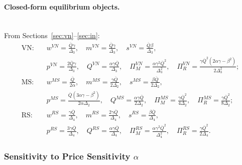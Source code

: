 \paragraph{Closed-form equilibrium objects.}\mbox{}\\
From Sections~\ref{sec:vn}--\ref{sec:in}:
\[
\begin{aligned}
\text{VN:}\quad
&w^{VN}=\frac{\overline Q\gamma}{\Delta_3},\quad
m^{VN}=\frac{\overline Q\gamma}{\Delta_3},\quad
s^{VN}=\frac{\overline Q\beta}{\Delta_3},\\
&p^{VN}=\frac{2\overline Q\gamma}{\Delta_3},\quad
Q^{VN}=\frac{\alpha\gamma\overline Q}{\Delta_3},\quad
\Pi_M^{VN}=\frac{\alpha\gamma^2\overline Q^2}{\Delta_3^2},\quad
\Pi_R^{VN}=\frac{\gamma\overline Q^2(2\alpha\gamma-\beta^2)}{2\Delta_3^2};
\\[0.5em]
\text{MS:}\quad
&w^{MS}=\frac{\overline Q}{2\alpha},\quad
m^{MS}=\frac{\gamma\overline Q}{2\Delta_2},\quad
s^{MS}=\frac{\beta\overline Q}{2\Delta_2},\\
&p^{MS}=\frac{\overline Q(3\alpha\gamma-\beta^2)}{2\alpha\Delta_2},\quad
Q^{MS}=\frac{\alpha\gamma\overline Q}{2\Delta_2},\quad
\Pi_M^{MS}=\frac{\gamma\overline Q^2}{4\Delta_2},\quad
\Pi_R^{MS}=\frac{\gamma\overline Q^2}{8\Delta_2};
\\[0.5em]
\text{RS:}\quad
&w^{RS}=\frac{\gamma\overline Q}{\Delta_4},\quad
m^{RS}=\frac{2\gamma\overline Q}{\Delta_4},\quad
s^{RS}=\frac{\beta\overline Q}{\Delta_4},\\
&p^{RS}=\frac{3\gamma\overline Q}{\Delta_4},\quad
Q^{RS}=\frac{\alpha\gamma\overline Q}{\Delta_4},\quad
\Pi_M^{RS}=\frac{\alpha\gamma^2\overline Q^2}{\Delta_4^2},\quad
\Pi_R^{RS}=\frac{\gamma\overline Q^2}{2\Delta_4}.
\end{aligned}
\]



\subsubsection{Sensitivity to Price Sensitivity \(\alpha\)}

